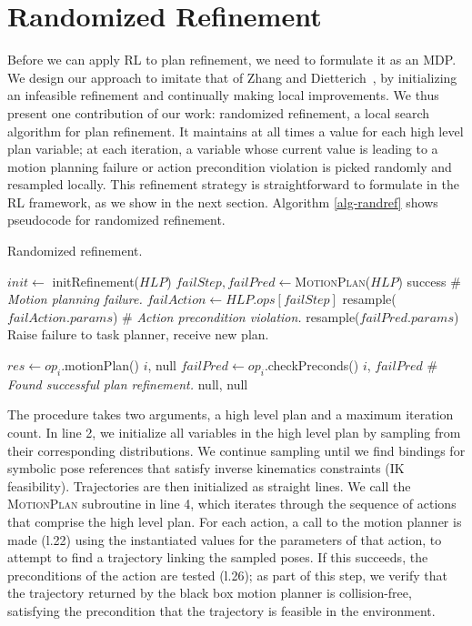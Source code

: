 \section{Randomized Refinement}
Before we can apply RL to plan refinement, we need to formulate it as an MDP.
We design our approach to imitate that of Zhang and Dietterich~\cite{JobShopSched}, by
initializing an infeasible refinement and continually making local improvements.
We thus present one contribution of our work: randomized refinement, a local search
algorithm for plan refinement. It maintains at all times a value for each high level plan
variable; at each iteration, a variable whose current value is leading to a motion planning failure or
action precondition violation is picked randomly and resampled locally. This refinement strategy
is straightforward to formulate in the RL framework, as we show in the next section.
Algorithm \ref{alg-randref} shows pseudocode for randomized refinement.

\begin{algorithm}
 \caption{Randomized refinement.} \label{alg-randref}
 \begin{algorithmic}[1]
  \State $init \leftarrow$ initRefinement($HLP$)
  \State $failStep, failPred \leftarrow $\textsc{MotionPlan}($HLP$)
  \State \Return success
  \Else
  \State \# \emph{Motion planning failure.}
  \State $failAction \leftarrow HLP.ops[failStep]$
  \State resample($failAction.params$)
  \Else
  \State \# \emph{Action precondition violation.}
  \State resample($failPred.params$)
  \EndIf
  \EndIf
  \EndFor
  \State Raise failure to task planner, receive new plan.
  \EndProcedure

  \State $res \leftarrow op_{i}$.motionPlan()
  \State \Return $i$, null
  \Else
  \State $failPred \leftarrow op_{i}$.checkPreconds()
  \State \Return $i$, $failPred$
  \Else
  \State \# \emph{Found successful plan refinement.}
  \State \Return null, null
  \EndIf
  \EndIf
  \EndFor
  \EndProcedure
 \end{algorithmic}
\end{algorithm}

The procedure takes two arguments, a high level plan and a maximum
iteration count. In line 2, we initialize all variables in the high level plan by sampling
from their corresponding distributions. We continue sampling
until we find bindings for symbolic pose references that satisfy
inverse kinematics constraints (IK feasibility). Trajectories are then
initialized as straight lines. We call the \textsc{MotionPlan} subroutine in line 4, which
iterates through the sequence of actions that comprise the high level plan.
For each action, a call to the motion planner is made (l.22) using the instantiated values
for the parameters of that action, to attempt to find a trajectory
linking the sampled poses. If this succeeds, the preconditions of the action
are tested (l.26); as part of this step, we verify that the trajectory returned by the
black box motion planner is collision-free, satisfying the precondition
that the trajectory is feasible in the environment.

